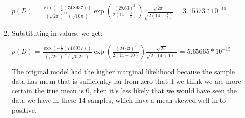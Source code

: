 \documentclass[submit]{harvardml}
\begin{document}
\begin{enumerate}
    $p(D) = \frac{\exp(-\frac{1}{2}(74.8937))}{(\sqrt{2\pi})^{14}(\sqrt{10\pi})}\exp(\frac{(29.63)^2}{2(14 + \frac{1}{5})})\frac{\sqrt{2\pi}}{\sqrt{2(14 + \frac{1}{5})}} = 3.15573*10^{-10}$
    
    \item 
    
    Substituting in values, we get:
    
    $p(D) = \frac{\exp(-\frac{1}{2}(74.8937))}{(\sqrt{2\pi})^{14}(\sqrt{0.2\pi})}\exp(\frac{(29.63)^2}{2(14 + 10)})\frac{\sqrt{2\pi}}{\sqrt{2(14 + 10)}} = 5.65665*10^{-15}$
    
    The original model had the higher marginal likelihood because the sample data has mean that is sufficiently far from zero that if we think we are more certain the true mean is 0, then it's less likely that we would have seen the data we have in these 14 samples, which have a mean skewed well in to positive.
    
\end{enumerate}
\end{document}
